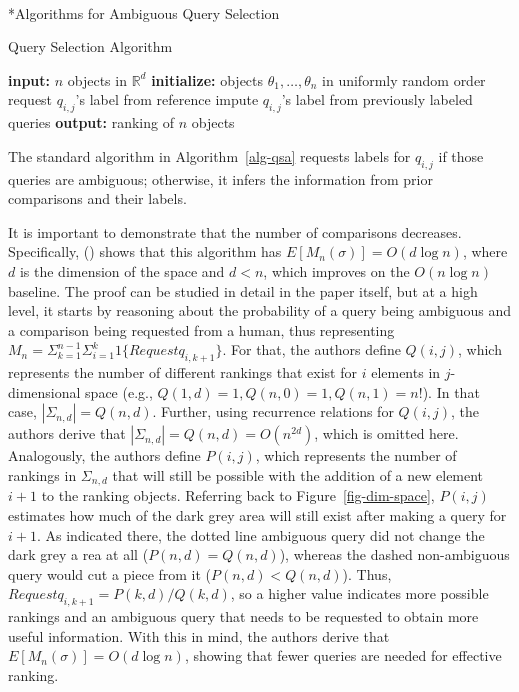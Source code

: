 \documentclass[
  letterpaper,
  numbers=noenddot,
  DIV=11]{scrreprt}
\makeatletter
\let\oldparagraph\paragraph
\renewcommand{\paragraph}{
    \@ifstar
      \xxxParagraphStar
      \xxxParagraphNoStar
  }
\newcommand{\xxxParagraphStar}[1]{\oldparagraph*{#1}\mbox{}}
\newcommand{\xxxParagraphNoStar}[1]{\oldparagraph{#1}\mbox{}}
\theoremstyle{definition}
\theoremstyle{plain}
\theoremstyle{plain}
\theoremstyle{remark}
\makeatother
\begin{document}
\paragraph*{Algorithms for Ambiguous Query
Selection}\label{algorithms-for-ambiguous-query-selection}

\begin{algorithm}[H]
    \caption{Query Selection Algorithm}
    \label{alg-qsa}
\begin{algorithmic}[1]
        \State \textbf{input:} $n$ objects in $\mathbb{R}^d$
        \State \textbf{initialize:} objects $\theta_1, \dots, \theta_n$ in uniformly random order
                    \State request $q_{i,j}$'s label from reference
                \Else
                    \State impute $q_{i,j}$'s label from previously labeled queries
                \EndIf
            \EndFor
        \EndFor
        \State \textbf{output:} ranking of $n$ objects
    \end{algorithmic}
\end{algorithm}

The standard algorithm in  Algorithm~\ref{alg-qsa}  requests labels for
\(q_{i,j}\) if those queries are ambiguous; otherwise, it infers the
information from prior comparisons and their labels.

It is important to demonstrate that the number of comparisons decreases.
Specifically, () shows that
this algorithm has \(E[M_n(\sigma)] = O(d\log n)\), where \(d\) is the
dimension of the space and \(d < n\), which improves on the
\(O(n\log n)\) baseline. The proof can be studied in detail in the paper
itself, but at a high level, it starts by reasoning about the
probability of a query being ambiguous and a comparison being requested
from a human, thus representing
\(M_n = \Sigma_{k=1}^{n-1}\Sigma_{i=1}^k 1\{Requestq_{i,k+1}\}\). For
that, the authors define \(Q(i,j)\), which represents the number of
different rankings that exist for \(i\) elements in \(j\)-dimensional
space (e.g., \(Q(1,d) = 1, Q(n,0) = 1, Q(n,1) = n!\)). In that case,
\(|\Sigma_{n,d}| = Q(n,d)\). Further, using recurrence relations for
\(Q(i,j)\), the authors derive that
\(|\Sigma_{n,d}| = Q(n,d) = O(n^{2d})\), which is omitted here.
Analogously, the authors define \(P(i,j)\), which represents the number
of rankings in \(\Sigma_{n,d}\) that will still be possible with the
addition of a new element \(i+1\) to the ranking objects. Referring back
to Figure~\ref{fig-dim-space}, \(P(i,j)\) estimates how much of the dark
grey area will still exist after making a query for \(i+1\). As
indicated there, the dotted line ambiguous query did not change the dark
grey a rea at all (\(P(n,d) = Q(n,d)\)), whereas the dashed
non-ambiguous query would cut a piece from it (\(P(n,d) < Q(n,d)\)).
Thus, \(Request q_{i,k+1} = P(k,d) / Q(k,d)\), so a higher value
indicates more possible rankings and an ambiguous query that needs to be
requested to obtain more useful information. With this in mind, the
authors derive that \(E[M_n(\sigma)] = O(d\log n)\), showing that fewer
queries are needed for effective ranking.
\end{document}
